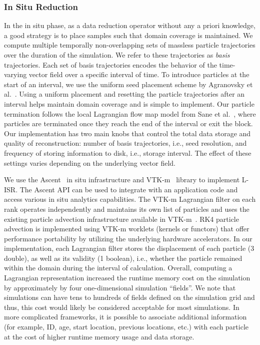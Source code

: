 \subsubsection{In Situ Reduction}
In the in situ phase, as a data reduction operator without any a priori knowledge, a good strategy is to place samples such that domain coverage is maintained.
%
We compute multiple temporally non-overlapping sets of massless particle trajectories over the duration of the simulation.
%
We refer to these trajectories as \textit{basis} trajectories.
%
Each set of basis trajectories encodes the behavior of the time-varying vector field over a specific interval of time.
%
To introduce particles at the start of an interval, we use the uniform seed placement scheme by Agranovsky et al.~\cite{agranovsky2014improved}. 
%
Using a uniform placement and resetting the particle trajectories after an interval helps maintain domain coverage and is simple to implement.
%
Our particle termination follows the local Lagrangian flow map model from Sane et al.~\cite{sane2020scalable}, where particles are terminated once they reach the end of the interval or exit the block.
%
Our implementation has two main knobs that control the total data storage and quality of reconstruction: number of basis trajectories, i.e., seed resolution, and frequency of storing information to disk, i.e., storage interval.
%
The effect of these settings varies depending on the underlying vector field. 
%

We use the Ascent~\cite{larsen2017alpine} in situ infrastructure and VTK-m~\cite{moreland2016vtk} library to implement L-ISR. 
%
The Ascent API can be used to integrate with an application code and access various in situ analytics capabilities.
The VTK-m Lagrangian filter on each rank operates independently and maintains its own list of particles and uses the existing particle advection infrastructure available in VTK-m~\cite{pugmire2018performance}.
%
RK4 particle advection is implemented using VTK-m worklets (kernels or functors) that offer performance portability by utilizing the underlying hardware accelerators.
%
In our implementation, each Lagrangian filter stores the displacement of each particle (3 double), as well as its validity (1 boolean), i.e., whether the particle remained within the domain during the interval of calculation.
%
Overall, computing a Lagrangian representation increased the runtime memory cost on the simulation by approximately by four one-dimensional simulation ``fields''.
%
We note that simulations can have tens to hundreds of fields defined on the simulation grid and thus, this cost would likely be considered acceptable for most simulations.
%
In more complicated frameworks, it is possible to associate additional information (for example, ID, age, start location, previous locations, etc.) with each particle at the cost of higher runtime memory usage and data storage.
%

